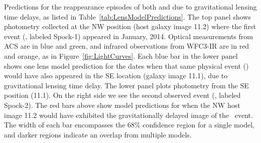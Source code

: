 \label{fig:SpockDelayPredictions}
Predictions for the reappearance episodes of both \spockone
and \spocktwo due to gravitational lensing time delays, as listed in
Table~\ref{tab:LensModelPredictions}.  The top panel shows photometry
collected at the NW position (host galaxy image 11.2) where the first
event (\spockone, labeled Spock-1) appeared in January, 2014.  Optical
measurements from ACS are in blue and green, and infrared observations
from WFC3-IR are in red and orange, as in
Figure~\ref{fig:LightCurves}.  Each blue bar in the lower panel shows
one lens model prediction for the dates when that same physical event
(\spockone) would have also appeared in the SE location (galaxy image
11.1), due to gravitational lensing time delay.  The lower panel plots
photometry from the SE position (11.1). On the right side we see the
second observed event (\spocktwo, labeled Spock-2).  The red bars above
show model predictions for when the NW host image 11.2 would have
exhibited the gravitationally delayed image of the \spocktwo\ event.
The width of each bar encompasses the 68\% confidence region for a
single model, and darker regions indicate an overlap from multiple
models.
  
